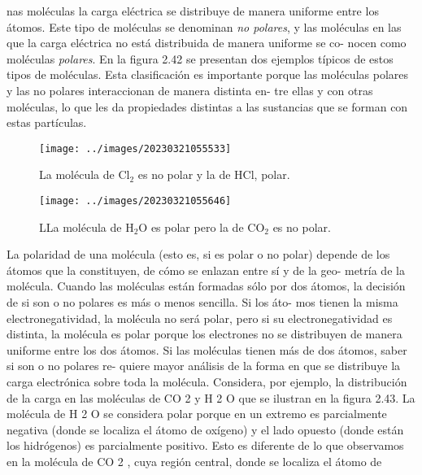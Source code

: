 \documentclass[12pt,addpoints,answers]{guia}
\begin{document}
\begin{questions}
{\begin{tcolorbox}
            nas moléculas la carga eléctrica se distribuye de manera uniforme entre los
            átomos. Este tipo de moléculas se denominan \emph{no polares}, y las moléculas
            en las que la carga eléctrica no está distribuida de manera uniforme se co-
            nocen como moléculas \emph{polares}. En la figura 2.42 se presentan dos ejemplos
            típicos de estos tipos de moléculas. Esta clasificación es importante porque
            las moléculas polares y las no polares interaccionan de manera distinta en-
            tre ellas y con otras moléculas, lo que les da propiedades distintas a las
            sustancias que se forman con estas partículas.
            \begin{figure}[H]
                \texttt{[image: ../images/20230321055533]}
                \caption{La molécula de Cl$_2$ es no polar y la de HCl, polar.}
                \label{fig:20230321055533}
            \end{figure}
            \begin{figure}[H]
                \texttt{[image: ../images/20230321055646]}
                \caption{LLa molécula de H$_2$O es polar pero la de CO$_2$ es no polar.}
                \label{fig:20230321055646}
            \end{figure}
            La polaridad de una molécula (esto es, si es polar o no polar) depende
            de los átomos que la constituyen, de cómo se enlazan entre sí y de la geo-
            metría de la molécula. Cuando las moléculas están formadas sólo por dos
            átomos, la decisión de si son o no polares es más o menos sencilla. Si los áto-
            mos tienen la misma electronegatividad, la molécula no será polar, pero si
            su electronegatividad es distinta, la molécula es polar porque los electrones
            no se distribuyen de manera uniforme entre los dos átomos.
            Si las moléculas tienen más de dos átomos, saber si son o no polares re-
            quiere mayor análisis de la forma en que se distribuye la carga electrónica
            sobre toda la molécula. Considera, por ejemplo, la distribución de la carga
            en las moléculas de CO 2 y H 2 O que se ilustran en la figura 2.43. La molécula
            de H 2 O se considera polar porque en un extremo es parcialmente negativa
            (donde se localiza el átomo de oxígeno) y el lado opuesto (donde están los
            hidrógenos) es parcialmente positivo. Esto es diferente de lo que observamos
            en la molécula de CO 2 , cuya región central, donde se localiza el átomo de

\end{tcolorbox}}
\end{questions}
\end{document}
